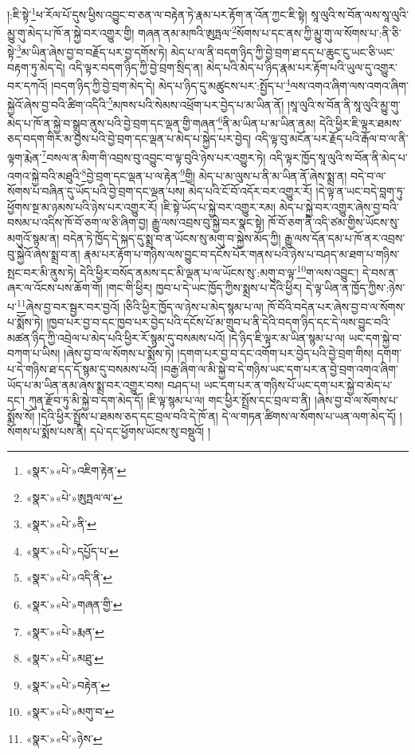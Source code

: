 །:ཇི་སྟེ་\footnote{«སྣར་»«པེ་»འཇིག་རྟེན་}ཕ་རོལ་པོ་དུས་ཕྱིས་འབྱུང་བ་ཅན་ལ་བརྟེན་ཏེ་རྣམ་པར་རྟོག་ན་འོན་ཀྱང་ཇི་སྟེ། སཱ་ལུའི་ས་བོན་ལས་སཱ་ལུའི་མྱུ་གུ་མེད་པ་ཁོ་ན་སྐྱེ་བར་འགྱུར་གྱི། གཞན་ནམ་མཁའི་ཨུཏྤལ་\footnote{«སྣར་»«པེ་»ཨུཏྤལ་ལ་}སོགས་པ་དང་ནས་ཀྱི་མྱུ་གུ་ལ་སོགས་པ་:ནི་ཅི་སྟེ་\footnote{«སྣར་»«པེ་»ནི་}མ་ཡིན་ཞེས་བྱ་བ་བརྗོད་པར་བྱ་དགོས་ཏེ། མེད་པ་ལ་ནི་བདག་ཉིད་ཀྱི་བྱེ་བྲག་ཐ་དད་པ་ཆུང་ངུ་ཡང་ཅི་ཡང་བརྟག་ཏུ་མེད་དེ། འདི་ལྟར་བདག་ཉིད་ཀྱི་བྱེ་བྲག་སྲིད་ན། མེད་པའི་མེད་པ་ཉིད་རྣམ་པར་རྟོག་པའི་ཡུལ་དུ་འགྱུར་བར་དཀའོ། །བདག་ཉིད་ཀྱི་བྱེ་བྲག་མེད་དེ། མེད་པ་ཉིད་དུ་མཚུངས་པར་:སྤྱོད་པ་\footnote{«སྣར་»«པེ་»དཔྱོད་པ་}ལས་འགའ་ཞིག་ལས་འགའ་ཞིག་སྐྱེའོ་ཞེས་བྱ་བའི་ཚིག་འདིའི་\footnote{«སྣར་»«པེ་»འདི་ནི་}མཁས་པའི་སེམས་འཕྲོག་པར་བྱེད་པ་མ་ཡིན་ནོ། །སཱ་ལུའི་ས་བོན་ནི་སཱ་ལུའི་མྱུ་གུ་མེད་པ་ཁོ་ན་སྐྱེ་བ་སྒྲུབ་ནུས་པའི་བྱེ་བྲག་དང་ལྡན་གྱི་གཞན་\footnote{«སྣར་»«པེ་»གཞན་གྱི་}ནི་མ་ཡིན་པ་མ་ཡིན་ནམ། དེའི་ཕྱིར་ཇི་ལྟར་ཐམས་ཅད་བདག་གིར་མ་བྱས་པའི་བྱེ་བྲག་དང་ལྡན་པ་མེད་པ་སྐྱེད་པར་བྱེད། འདི་ལྟ་བུ་མངོན་པར་རྗོད་པའི་རྒོལ་བ་ལ་ནི་ལྟག་རྨེན་\footnote{«སྣར་»«པེ་»རྨན་}བསལ་ན་མིག་གི་འབྲས་བུ་འབྱུང་བ་ལྟ་བུའི་ཉེས་པར་འགྱུར་ཏེ། འདི་ལྟར་ཁྱོད་སཱ་ལུའི་ས་བོན་ནི་མེད་པ་འགའ་སྐྱེ་བའི་མཐུའི་\footnote{«སྣར་»«པེ་»མཐུ་}བྱེ་བྲག་དང་ལྡན་པ་ལ་རྟེན་\footnote{«སྣར་»«པེ་»བརྟེན་}གྱི། མེད་པ་མ་ལུས་པ་ནི་མ་ཡིན་ནོ་ཞེས་སྨྲ་ན། བདེ་བ་ལ་སོགས་པ་བཞིན་དུ་ཡོད་པའི་བྱེ་བྲག་དང་ལྡན་པས། མེད་པའི་ངོ་བོ་འདོར་བར་འགྱུར་རོ། །དེ་ལྟ་ན་ཡང་བདེ་བླག་ཏུ་ཕྱོགས་སྔ་མ་ཉམས་པའི་ཉེས་པར་འགྱུར་རོ། །ཇི་སྟེ་ཡོད་པ་སྐྱེ་བར་འགྱུར་རམ། མེད་པ་སྐྱེ་བར་འགྱུར་ཞེས་བྱ་བའི་བསམ་པ་འདིས་ཁོ་བོ་ཅག་ལ་ཅི་ཞིག་བྱ། རྒྱུ་ལས་འབྲས་བུ་སྐྱེ་བར་སྣང་སྟེ། ཁོ་བོ་ཅག་ནི་འདི་ཙམ་གྱིས་ཡོངས་སུ་མགུའོ་སྙམ་ན། བདེན་ཏེ་ཁྱོད་དེ་སྐད་དུ་སྨྲ་བ་ན་ཡོངས་སུ་མགུ་བ་སྐྱེས་མོད་ཀྱི། རྒྱུ་ལས་དོན་དམ་པ་ཁོ་ནར་འབྲས་བུ་སྐྱེའོ་ཞེས་སྨྲ་བ་ན། རྣམ་པར་རྟོག་པ་གཉིས་ལས་བྱུང་བ་དངོས་པོར་གནས་པའི་ཉེས་པ་བཤད་མ་ཐག་པ་གཉིས་སྤང་བར་མི་ནུས་ཏེ། དེའི་ཕྱིར་བསོད་ནམས་དང་མི་ལྡན་པ་ལ་ཡོངས་སུ་:མགུ་བ་ལྟ་\footnote{«སྣར་»«པེ་»མགུ་བ་}ག་ལས་འབྱུང་། དེ་བས་ན་ཞར་ལ་འོངས་པས་ཆོག་གོ། །གང་གི་ཕྱིར། ཁྱབ་པ་དེ་ཡང་ཁྱོད་ཀྱིས་སྨྲས་པ་དེའི་ཕྱིར། དེ་ལྟ་ཡིན་ན་ཁྱོད་ཀྱིས་:ཉེས་པ་\footnote{«སྣར་»«པེ་»ཉེས་}ཞེས་བྱ་བར་སྦྱར་བར་བྱའོ། །ཅིའི་ཕྱིར་ཁྱོད་ལ་ཉེས་པ་མེད་སྙམ་པ་ལ། ཁོ་བོའི་བདེན་པར་ཞེས་བྱ་བ་ལ་སོགས་པ་སྨོས་ཏེ། །ཁྱབ་པར་བྱ་བ་དང་ཁྱབ་པར་བྱེད་པའི་དངོས་པོ་མ་གྲུབ་པ་ནི་དེའི་བདག་ཉིད་དང་དེ་ལས་བྱུང་བའི་མཚན་ཉིད་ཀྱི་འབྲེལ་པ་མེད་པའི་ཕྱིར་རོ་སྙམ་དུ་བསམས་པའོ། །དེ་ཉིད་ཇི་ལྟར་མ་ཡིན་སྙམ་པ་ལ། ཡང་དག་སྐྱེ་བ་བཀག་པ་ཡིས། །ཞེས་བྱ་བ་ལ་སོགས་པ་སྨོས་ཏེ། །དགག་པར་བྱ་བ་དང་འགོག་པར་བྱེད་པའི་བྱེ་བྲག་གིས། དགག་པ་དེ་གཉིས་ཐ་དད་དོ་སྙམ་དུ་བསམས་པའོ། །བརྒྱ་ཞིག་ལ་མི་སྐྱེ་བ་དེ་གཉིས་ཡང་དག་པར་ན་བྱེ་བྲག་འགའ་ཞིག་ཡོད་པ་མ་ཡིན་ནམ་ཞེས་སྨྲ་བར་འགྱུར་བས། བཤད་པ། ཡང་དག་པར་ན་གཉིས་པོ་ཡང་དག་པར་སྐྱེ་བ་མེད་པ་དང་། ཀུན་རྫོབ་ཏུ་མི་སྐྱེ་བ་དག་མེད་དོ། །ཇི་ལྟ་སྙམ་པ་ལ། གང་ཕྱིར་སྤྲོས་དང་བྲལ་བ་ནི། །ཞེས་བྱ་བ་ལ་སོགས་པ་སྨོས་སོ། །དེའི་ཕྱིར་སྤྲོས་པ་ཐམས་ཅད་དང་བྲལ་བའི་དེ་ཁོ་ན། དེ་ལ་གཏན་ཚིགས་ལ་སོགས་པ་ཡན་ལག་མེད་དོ། །སོགས་པ་སྨོས་པས་ནི། དཔེ་དང་ཕྱོགས་ཡོངས་སུ་བསྡུའོ། །
